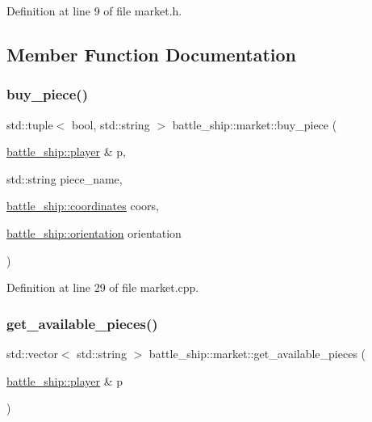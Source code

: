 Definition at line 9 of file market.\+h.



\subsection{Member Function Documentation}
\mbox{\label{classbattle__ship_1_1market_abe69f96f41fb16a74dc26b5a091d964d}} 
\subsubsection{\texorpdfstring{buy\+\_\+piece()}{buy\_piece()}}
{\footnotesize\ttfamily std\+::tuple$<$ bool, std\+::string $>$ battle\+\_\+ship\+::market\+::buy\+\_\+piece (\begin{DoxyParamCaption}\item[{\hyperlink{classbattle__ship_1_1player}{battle\+\_\+ship\+::player} \&}]{p,  }\item[{std\+::string}]{piece\+\_\+name,  }\item[{\hyperlink{structbattle__ship_1_1coordinates}{battle\+\_\+ship\+::coordinates}}]{coors,  }\item[{\hyperlink{namespacebattle__ship_aed87488f0a73f0d0679fe343fb61c784}{battle\+\_\+ship\+::orientation}}]{orientation }\end{DoxyParamCaption})\hspace{0.3cm}{\ttfamily [static]}}



Definition at line 29 of file market.\+cpp.

\mbox{\label{classbattle__ship_1_1market_a51ff4c8a34dd27f8bb8fcf5cffcdfd95}} 
\subsubsection{\texorpdfstring{get\+\_\+available\+\_\+pieces()}{get\_available\_pieces()}}
{\footnotesize\ttfamily std\+::vector$<$ std\+::string $>$ battle\+\_\+ship\+::market\+::get\+\_\+available\+\_\+pieces (\begin{DoxyParamCaption}\item[{\hyperlink{classbattle__ship_1_1player}{battle\+\_\+ship\+::player} \&}]{p }\end{DoxyParamCaption})\hspace{0.3cm}{\ttfamily [static]}}



